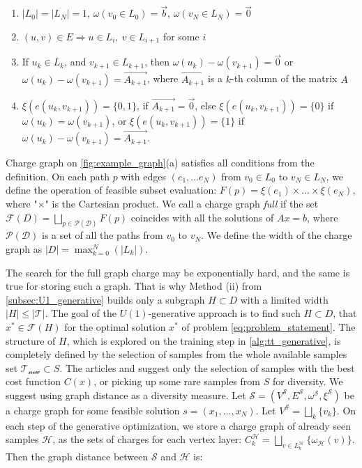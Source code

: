 \documentclass{article}
\theoremstyle{plain}
\theoremstyle{definition}
\theoremstyle{remark}
\begin{document}
\begin{enumerate}
    \item $|L_0| = |L_N| = 1$, $\omega(v_0\in L_0) = \vec{b}$, $\omega(v_N\in L_N)=\vec{0}$
    \item $(u, v) \in E \Rightarrow u\in L_i, \: v \in L_{i+1}$ for some $i$ 
    \item If $u_k\in L_k$, and $v_{k+1}\in L_{k+1}$, then $\omega(u_k)-\omega(v_{k+1})=\vec{0}$ or $\omega(u_k)-\omega(v_{k+1})=\vec{A_{k+1}}$, where $\vec{A_{k+1}}$ is a $k$-th column of the matrix $A$
    \item $\xi(e(u_k, v_{k+1})) = \{0, 1\}$, if $\vec{A_{k+1}} = \vec{0}$, else $\xi(e(u_k, v_{k+1})) = \{0\}$ if $\omega(u_k)=\omega(v_{k+1})$, or $\xi(e(u_k, v_{k+1})) = \{1\}$ if $\omega(u_k)-\omega(v_{k+1})=\vec{A_{k+1}}$.
\end{enumerate}

Charge graph on \cref{fig:example_graph}(a) satisfies all conditions from the definition. On each path $p$ with edges $(e_1, \dots e_N)$ from $v_0 \in L_0$ to $v_N \in L_N$, we define the operation of feasible subset evaluation: $F(p) = \xi(e_1) \times \dots \times \xi(e_N)$, where "$\times$" is the Cartesian product. We call a charge graph \textit{full} if the set $\mathcal{F}(D)=\bigsqcup_{p\in \mathcal{P}(\mathcal{D})}F(p)$ coincides with all the solutions of $Ax=b$, where $\mathcal{P}(\mathcal{D})$ is a set of all the paths from $v_0$ to $v_N$. We define the width of the charge graph as $|D|=\max_{k=0}^{N}\left(|L_k|\right)$. 

The search for the full graph charge may be exponentially hard, and the same is true for storing such a graph. That is why Method (ii) from \cref{subsec:U1_generative} builds only a subgraph $H\subset D$ with a limited width $|H|\leq |\mathcal{T}|$. The goal of the $U(1)$-generative approach is to find such $H\subset D$, that $x^{*} \in \mathcal{F}(H)$ for the optimal solution $x^{*}$ of problem \eqref{eq:problem_statement}. The structure of $H$, which is explored on the training step in \cref{alg:tt_generative}, is completely defined by the selection of samples from the whole available samples set $\mathcal{T_\text{new}}\subset S$. The articles \cite{Alcazar2024} and \cite{LopezPiqueres2023} suggest only the selection of samples with the best cost function $C(x)$, or picking up some rare samples from $S$ for diversity. We suggest using graph distance as a diversity measure. Let $\mathcal{S}=(V^{\mathcal{S}}, E^{\mathcal{S}}, \omega^{\mathcal{S}}, \xi^{\mathcal{S}})$ be a charge graph for some feasible solution $s=(x_1,\dots, x_N)$. Let $V^{\mathcal{S}}=\bigsqcup_k \{v_k\}$. On each step of the generative optimization, we store a charge graph of already seen samples $\mathcal{H}$, as the sets of charges for each vertex layer: $C_k^{\mathcal{H}} = \bigsqcup_{v\in L_k^{\mathcal{H}}} \{\omega_{\mathcal{H}}(v)\}$. Then the graph distance between $\mathcal{S}$ and $\mathcal{H}$ is:
\end{document}

